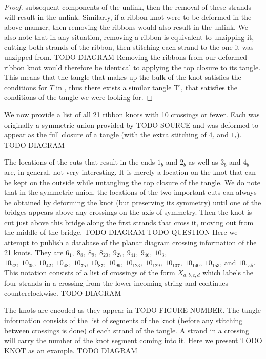 \begin{paper}
\begin{proof}
subsequent components of the unlink, then the removal of these strands will
result in the unlink.
Similarly, if a ribbon knot were to be deformed in the above manner, then
removing the ribbons would also result in the unlink.
We also note that in any situation, removing a ribbon is equivalent to unzipping
it, cutting both strands of the ribbon, then stitching each strand to the one it
was unzipped from.
TODO DIAGRAM
Removing the ribbons from our deformed ribbon knot would therefore be identical
to applying the top closure to its tangle.
This means that the tangle that makes up the bulk of the knot satisfies the
conditions for $T$ in \lemtangles, thus there exists a similar tangle T', that
satisfies the conditions of the tangle we were looking for.
\end{proof}
We now provide a list of all 21 ribbon knots with 10 crossings or fewer.
Each was originally a symmetric union provided by TODO SOURCE and was deformed
to appear as the full closure of a tangle (with the extra stitching of $4_t$ and
$1_t$).
TODO DIAGRAM

The locations of the cuts that result in the ends $1_b$ and $2_b$ as well as
$3_b$ and $4_b$ are, in general, not very interesting.
It is merely a location on the knot that can be kept on the outside while
untangling the top closure of the tangle.
We do note that in the symmetric union, the locations of the two important cuts
can always be obtained by deforming the knot (but preserving its symmetry) until
one of the bridges appears above any crossings on the axis of symmetry.
Then the knot is cut just above this bridge along the first strands that cross
it, moving out from the middle of the bridge.
TODO DIAGRAM
TODO QUESTION
Here we attempt to publish a database of the planar diagram crossing information
of the 21 knots.
They are $6_1,~8_8,~8_9,~8_{20},~9_{27},~9_{41},~9_{46},~10_3$,
$10_{22},~10_{35},~10_{42},~10_{48},~10_{75},~10_{87},~10_{99}$,
$10_{123},~10_{129},~10_{137},~10_{140},~10_{153}$, and $10_{155}$.
This notation consists of a list of crossings of the form $X_{a,b,c,d}$ which
labels the four strands in a crossing from the lower incoming string and
continues counterclockwise.
TODO DIAGRAM

The knots are encoded as they appear in TODO FIGURE NUMBER.
The tangle information consists of the list of segments of the knot (before any
stitching between crossings is done) of each strand of the tangle.
A strand in a crossing will carry the number of the knot segment coming into it.
Here we present TODO KNOT as an example.
TODO DIAGRAM


\end{paper}
